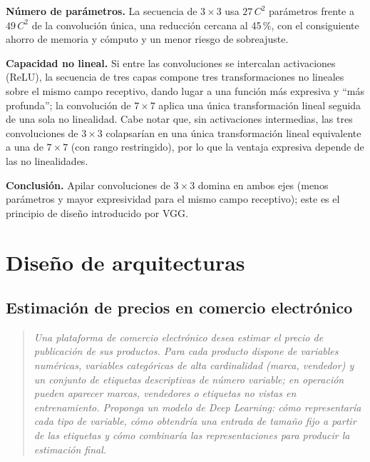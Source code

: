 \documentclass[12pt, a4paper]{article}
\newenvironment{enunciado}
  {\begin{quote}\itshape\color{black!75}}
  {\end{quote}}
\begin{document}
\textbf{Número de parámetros.} La secuencia de $3\times 3$ usa $27\,C^2$ parámetros frente
a $49\,C^2$ de la convolución única, una reducción cercana al 45\,\%, con el consiguiente
ahorro de memoria y cómputo y un menor riesgo de sobreajuste.

\textbf{Capacidad no lineal.} Si entre las convoluciones se intercalan activaciones (ReLU),
la secuencia de tres capas compone tres transformaciones no lineales sobre el mismo campo
receptivo, dando lugar a una función más expresiva y ``más profunda''; la convolución de
$7\times 7$ aplica una única transformación lineal seguida de una sola no linealidad. Cabe
notar que, sin activaciones intermedias, las tres convoluciones de $3\times 3$ colapsarían
en una única transformación lineal equivalente a una de $7\times 7$ (con rango restringido),
por lo que la ventaja expresiva depende de las no linealidades.

\textbf{Conclusión.} Apilar convoluciones de $3\times 3$ domina en ambos ejes (menos
parámetros y mayor expresividad para el mismo campo receptivo); este es el principio de
diseño introducido por VGG.

\section{Diseño de arquitecturas}

\subsection{Estimación de precios en comercio electrónico}

\begin{enunciado}
Una plataforma de comercio electrónico desea estimar el precio de publicación de sus
productos. Para cada producto dispone de variables numéricas, variables categóricas de alta
cardinalidad (marca, vendedor) y un conjunto de etiquetas descriptivas de número variable;
en operación pueden aparecer marcas, vendedores o etiquetas no vistas en entrenamiento.
Proponga un modelo de Deep Learning: cómo representaría cada tipo de variable, cómo
obtendría una entrada de tamaño fijo a partir de las etiquetas y cómo combinaría las
representaciones para producir la estimación final.
\end{enunciado}
\end{document}
